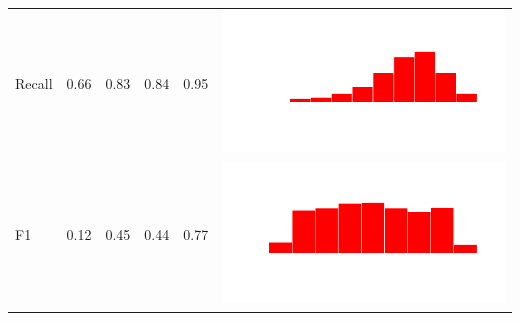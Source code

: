 \documentclass[conference]{IEEEtran}
\begin{document}
\begin{table}
\begin{tabular}{lrrrrc}
    Recall & 0.66 & 0.83 & 0.84 & 0.95 & \includegraphics[scale = 0.1, clip = true, trim= 50px 60px 50px 60px]{../figs/hist-results/hist-LRrec.pdf} \\
    F1 & 0.12 & 0.45 & 0.44 & 0.77 & \includegraphics[scale = 0.1, clip = true, trim= 50px 60px 50px 60px]{../figs/hist-results/hist-LRf1.pdf} \\


\end{tabular}
\end{table}
\end{document}
